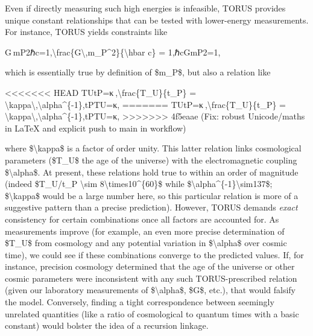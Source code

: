 \documentclass[]{article}
\begin{document}
Even if directly measuring such high energies is infeasible, TORUS
provides unique constant relationships that can be tested with
lower-energy measurements. For instance, TORUS yields constraints like

G mP2ℏc=1,\textbackslash{}frac\{G\textbackslash{},m\_P\^{}2\}\{\textbackslash{}hbar
c\} = 1,ℏcGmP2​​=1,

which is essentially true by definition of \$m\_P\$, but also a relation
like

<<<<<<< HEAD
TUtP=κ ,\textbackslash frac\{T\_U\}\{t\_P\} =
\textbackslash kappa\textbackslash,\textbackslash alpha\^{}\{-1\},tP\hspace{0pt}TU\hspace{0pt}\hspace{0pt}=κ,
=======
TUtP=κ ,\textbackslash{}frac\{T\_U\}\{t\_P\} =
\textbackslash{}kappa\textbackslash{},\textbackslash{}alpha\^{}\{-1\},tP​TU​​=κ,
>>>>>>> 4f5eaae (Fix: robust Unicode/maths in LaTeX and explicit push to main in workflow)

where \$\textbackslash{}kappa\$ is a factor of order unity. This latter
relation links cosmological parameters (\$T\_U\$ the age of the
universe) with the electromagnetic coupling \$\textbackslash{}alpha\$.
At present, these relations hold true to within an order of magnitude
(indeed \$T\_U/t\_P \textbackslash{}sim
8\textbackslash{}times10\^{}\{60\}\$ while
\$\textbackslash{}alpha\^{}\{-1\}\textbackslash{}sim137\$;
\$\textbackslash{}kappa\$ would be a large number here, so this
particular relation is more of a suggestive pattern than a precise
prediction). However, TORUS demands \emph{exact} consistency for certain
combinations once all factors are accounted for. As measurements improve
(for example, an even more precise determination of \$T\_U\$ from
cosmology and any potential variation in \$\textbackslash{}alpha\$ over
cosmic time), we could see if these combinations converge to the
predicted values. If, for instance, precision cosmology determined that
the age of the universe or other cosmic parameters were inconsistent
with any such TORUS-prescribed relation (given our laboratory
measurements of \$\textbackslash{}alpha\$, \$G\$, etc.), that would
falsify the model. Conversely, finding a tight correspondence between
seemingly unrelated quantities (like a ratio of cosmological to quantum
times with a basic constant) would bolster the idea of a recursion
linkage.
\end{document}
